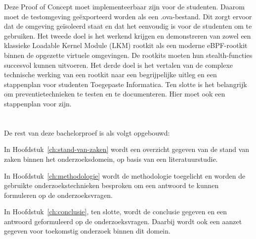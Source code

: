 Deze Proof of Concept moet implementeerbaar zijn voor de studenten. Daarom moet de testomgeving geëxporteerd worden als een .ova-bestand. Dit zorgt ervoor dat de omgeving geïsoleerd staat en dat het eenvoudig is voor de studenten om te gebruiken. Het tweede doel is het werkend krijgen en demonstreren van zowel een klassieke Loadable Kernel Module (LKM) rootkit als een moderne eBPF-rootkit binnen de opgezette virtuele omgevingen. De rootkits moeten hun stealth-functies succesvol kunnen uitvoeren. Het derde doel is het vertalen van de complexe technische werking van een rootkit naar een begrijpelijke uitleg en een stappenplan voor studenten Toegepaste Informatica. Ten slotte is het belangrijk om preventietechnieken te testen en te documenteren. Hier moet ook een stappenplan voor zijn.

\section{}%
\label{sec:opzet-bachelorproef}


De rest van deze bachelorproef is als volgt opgebouwd:

In Hoofdstuk~\ref{ch:stand-van-zaken} wordt een overzicht gegeven van de stand van zaken binnen het onderzoeksdomein, op basis van een literatuurstudie.

In Hoofdstuk~\ref{ch:methodologie} wordt de methodologie toegelicht en worden de gebruikte onderzoekstechnieken besproken om een antwoord te kunnen formuleren op de onderzoeksvragen.


In Hoofdstuk~\ref{ch:conclusie}, ten slotte, wordt de conclusie gegeven en een antwoord geformuleerd op de onderzoeksvragen. Daarbij wordt ook een aanzet gegeven voor toekomstig onderzoek binnen dit domein.